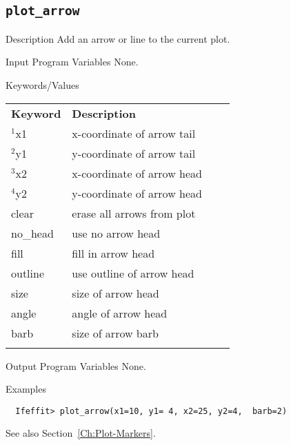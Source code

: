 \subsection{\texttt{plot\_arrow}}  \label{Ch:Command:plot-arrow}
\begin{IFFcom}
\item[Description] Add an arrow or line to the current plot.

\item[Input Program Variables] None.
\item[Keywords/Values] 

{\relax \hspace{0.25truein}\par\noindent\relax}
\begin{tabular}{llrl}
  \textbf{Keyword} &  \textbf{Description}\\
  \noalign{\smallskip}
  ${}^1${x1}   & x-coordinate of arrow tail\\
  ${}^2${y1}   & y-coordinate of arrow tail\\
  ${}^3${x2}   & x-coordinate of arrow head\\
  ${}^4${y2}   & y-coordinate of arrow head\\
  clear        & erase all arrows from plot\\
  no\_head     & use no arrow head\\
  fill         & fill in arrow head\\
  outline      & use outline of arrow head\\
  size         & size of arrow head\\
  angle        & angle of arrow head\\
  barb         & size of arrow barb\\
  \noalign{\smallskip}
\end{tabular}
\noindent
\item[Output Program Variables] None.
\item[Examples] {\hspace{1.in} \vspace{-0.1truein} \relax }
\begin{verbatim} 
  Ifeffit> plot_arrow(x1=10, y1= 4, x2=25, y2=4,  barb=2)
\end{verbatim}
\item[See also] Section~\ref{Ch:Plot-Markers}.
\end{IFFcom}

